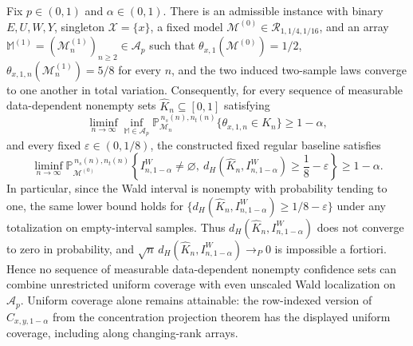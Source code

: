 Fix \(p\in(0,1)\) and \(\alpha\in(0,1)\). There is an admissible instance with binary \(E,U,W,Y\), singleton \(\mathcal X=\{x\}\), a fixed model \(\mathcal M^{(0)}\in\mathcal R_{1,1/4,1/16}\), and an array \(\mathbb M^{(1)}=(\mathcal M^{(1)}_n)_{n\ge2}\in\mathcal A_p\) such that \(\theta_{x,1}(\mathcal M^{(0)})=1/2\), \(\theta_{x,1,n}(\mathcal M^{(1)}_n)=5/8\) for every \(n\), and the two induced two-sample laws converge to one another in total variation. Consequently, for every sequence of measurable data-dependent nonempty sets \(\widehat K_n\subseteq[0,1]\) satisfying
\[
\liminf_{n\to\infty}\inf_{\mathbb M\in\mathcal A_p}
\mathbb P_{\mathcal M_n}^{\,n_s(n),n_t(n)}
\{\theta_{x,1,n}\in\widehat K_n\}
\ge 1-\alpha,
\]
and every fixed \(\varepsilon\in(0,1/8)\), the constructed fixed regular baseline satisfies
\[
\liminf_{n\to\infty}
\mathbb P_{\mathcal M^{(0)}}^{\,n_s(n),n_t(n)}
\left\{I^W_{n,1-\alpha}\ne\varnothing,\ 
d_H\!\left(\widehat K_n,I^W_{n,1-\alpha}\right)
\ge\frac18-\varepsilon\right\}
\ge1-\alpha.
\]
In particular, since the Wald interval is nonempty with probability tending to one, the same lower bound holds for \(\{d_H(\widehat K_n,I^W_{n,1-\alpha})\ge1/8-\varepsilon\}\) under any totalization on empty-interval samples. Thus \(d_H(\widehat K_n,I^W_{n,1-\alpha})\) does not converge to zero in probability, and \(\sqrt n\,d_H(\widehat K_n,I^W_{n,1-\alpha})\longrightarrow_P0\) is impossible a fortiori. Hence no sequence of measurable data-dependent nonempty confidence sets can combine unrestricted uniform coverage with even unscaled Wald localization on \(\mathcal A_p\). Uniform coverage alone remains attainable: the row-indexed version of \(\widehat C_{x,y,1-\alpha}\) from the concentration projection theorem has the displayed uniform coverage, including along changing-rank arrays.